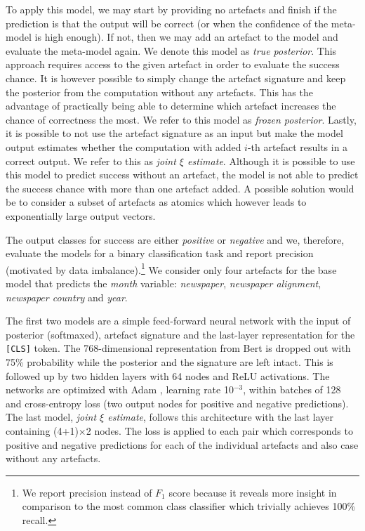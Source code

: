 To apply this model, we may start by providing no artefacts and finish if the prediction is that the output will be correct (or when the confidence of the meta-model is high enough).
If not, then we may add an artefact to the model and evaluate the meta-model again.
We denote this model as \emph{true posterior}.
This approach requires access to the given artefact in order to evaluate the success chance.
It is however possible to simply change the artefact signature and keep the posterior from the computation without any artefacts.
This has the advantage of practically being able to determine which artefact increases the chance of correctness the most.
We refer to this model as \emph{frozen posterior}.
Lastly, it is possible to not use the artefact signature as an input but make the model output estimates whether the computation with added $i$-th artefact results in a correct output.
We refer to this as \emph{joint $\xi$ estimate}.
Although it is possible to use this model to predict success without an artefact, the model is not able to predict the success chance with more than one artefact added.
A possible solution would be to consider a subset of artefacts as atomics which however leads to exponentially large output vectors.

The output classes for success are either \emph{positive} or \emph{negative} and we, therefore, evaluate the models for a binary classification task and report precision (motivated by data imbalance).\footnote{
We report precision instead of $F_1$ score because it reveals more insight in comparison to the most common class classifier which trivially achieves 100\% recall.
}
We consider only four artefacts for the base model that predicts the \emph{month} variable: \emph{newspaper}, \emph{newspaper alignment}, \emph{newspaper country} and \emph{year}.

The first two models are a simple feed-forward neural network with the input of posterior (softmaxed), artefact signature and the last-layer representation for the \texttt{[CLS]} token.
The 768-dimensional representation from Bert is dropped out with 75\% probability while the posterior and the signature are left intact.
This is followed up by two hidden layers with 64 nodes and ReLU activations.
The networks are optimized with Adam \cite{kingma2017adam}, learning rate 10$^{-3}$, within batches of 128 and cross-entropy loss (two output nodes for positive and negative predictions).
The last model, \emph{joint $\xi$ estimate}, follows this architecture with the last layer containing (4+1)$\times$2 nodes.
The loss is applied to each pair which corresponds to positive and negative predictions for each of the individual artefacts and also case without any artefacts.

